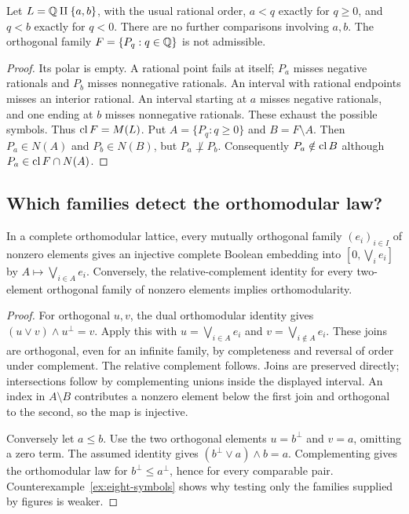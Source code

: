 \begin{counterexample}\label{ex:infinite-flag}
Let $L=\mathbb Q\amalg\{a,b\}$, with the usual rational order,
$a<q$ exactly for $q\ge0$, and $q<b$ exactly for $q<0$.
There are no further comparisons involving $a,b$.
The orthogonal family $F=\{P_q:q\in\mathbb Q\}$ is not admissible.
\end{counterexample}
\begin{proof}
Its polar is empty. A rational point fails at itself; $P_a$ misses
negative rationals and $P_b$ misses nonnegative rationals. An
interval with rational endpoints misses an interior rational.
An interval starting at $a$ misses negative rationals, and one
ending at $b$ misses nonnegative rationals. These exhaust the
possible symbols. Thus $\operatorname{cl} F=M(L)$.
Put $A=\{P_q:q\ge0\}$ and $B=F\setminus A$.
Then $P_a\in N(A)$ and $P_b\in N(B)$, but $P_a\not\perp P_b$.
Consequently $P_a\notin\operatorname{cl} B$ although
$P_a\in\operatorname{cl} F\cap N(A)$.
\end{proof}

\subsection{Which families detect the orthomodular law?}
\begin{proposition}\label{prop:orthogonal-families}
In a complete orthomodular lattice, every mutually orthogonal
family $(e_i)_{i\in I}$ of nonzero elements gives an injective
complete Boolean embedding into $[0,\bigvee_i e_i]$ by
$A\mapsto\bigvee_{i\in A}e_i$.
Conversely, the relative-complement identity for every two-element
orthogonal family of nonzero elements implies orthomodularity.
\end{proposition}
\begin{proof}
For orthogonal $u,v$, the dual orthomodular identity gives
$(u\vee v)\wedge u^\perp=v$. Apply this with
$u=\bigvee_{i\in A}e_i$ and $v=\bigvee_{i\notin A}e_i$.
These joins are orthogonal, even for an infinite family, by
completeness and reversal of order under complement.
The relative complement follows. Joins are preserved directly;
intersections follow by complementing unions inside the displayed
interval. An index in $A\setminus B$ contributes a nonzero element
below the first join and orthogonal to the second, so the map is
injective.

Conversely let $a\le b$. Use the two orthogonal elements
$u=b^\perp$ and $v=a$, omitting a zero term. The assumed identity
gives $(b^\perp\vee a)\wedge b=a$. Complementing gives the
orthomodular law for $b^\perp\le a^\perp$, hence for every
comparable pair. Counterexample~\ref{ex:eight-symbols} shows why
testing only the families supplied by figures is weaker.
\end{proof}

